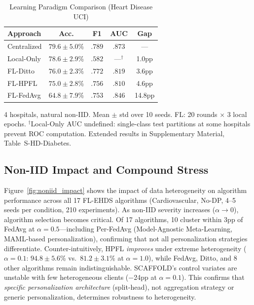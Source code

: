 \documentclass[conference]{IEEEtran}
\begin{document}
\begin{table}[htbp]
\centering
\caption{Learning Paradigm Comparison (Heart Disease UCI)}
\label{tab:fl_vs_central}
\small
\begin{tabular}{lcccc}
\toprule
\textbf{Approach} & \textbf{Acc.} & \textbf{F1} & \textbf{AUC} & \textbf{Gap} \\
\midrule
Centralized & $79.6 \pm 5.0$\% & $.789$ & $.873$ & --- \\
Local-Only & $78.6 \pm 2.9$\% & $.582$ & ---$^\dagger$ & 1.0pp \\
FL-Ditto & $76.0 \pm 2.3$\% & $.772$ & $.819$ & 3.6pp \\
FL-HPFL & $75.0 \pm 2.8$\% & $.756$ & $.810$ & 4.6pp \\
FL-FedAvg & $64.8 \pm 7.9$\% & $.753$ & $.846$ & 14.8pp \\
\bottomrule
\end{tabular}

\vspace{1mm}
\footnotesize{4 hospitals, natural non-IID. Mean $\pm$ std over 10 seeds. FL: 20 rounds $\times$ 3 local epochs. $^\dagger$Local-Only AUC undefined: single-class test partitions at some hospitals prevent ROC computation. Extended results in Supplementary Material, Table~S-HD-Diabetes.}
\end{table}

\subsection{Non-IID Impact and Compound Stress}

Figure~\ref{fig:noniid_impact} shows the impact of data heterogeneity on algorithm performance across all 17 FL-EHDS algorithms (Cardiovascular, No-DP, 4--5 seeds per condition, 210 experiments). As non-IID severity increases ($\alpha \to 0$), algorithm selection becomes critical. Of 17 algorithms, 10 cluster within 3pp of FedAvg at $\alpha{=}0.5$---including Per-FedAvg (Model-Agnostic Meta-Learning, MAML-based personalization), confirming that not all personalization strategies differentiate. Counter-intuitively, HPFL \textit{improves} under extreme heterogeneity ($\alpha{=}0.1$: $94.8 \pm 5.6$\% vs.\ $81.2 \pm 3.1$\% at $\alpha{=}1.0$), while FedAvg, Ditto, and 8 other algorithms remain indistinguishable. SCAFFOLD's control variates are unstable with few heterogeneous clients ($-$24pp at $\alpha{=}0.1$). This confirms that \textit{specific personalization architecture} (split-head), not aggregation strategy or generic personalization, determines robustness to heterogeneity.
\end{document}

